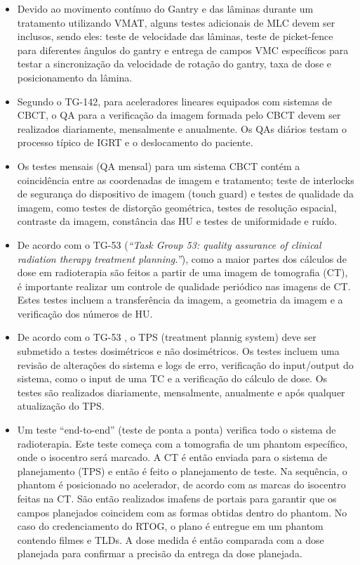 \documentclass[11pt,a4paper]{article}
\newcounter{exemplo}
\begin{document}
\begin{exemplo}[Qualidade]
\begin{itemize}
        \item Devido ao movimento contínuo do Gantry e das lâminas durante um tratamento utilizando VMAT, alguns testes adicionais de MLC devem ser inclusos, sendo eles: teste de velocidade das lâminas, teste de picket-fence para diferentes ângulos do gantry e entrega de campos VMC específicos para testar a sincronização da velocidade de rotação do gantry, taxa de dose e posicionamento da lâmina.

        \item Segundo o TG-142, para aceleradores lineares equipados com sistemas de CBCT, o QA para a verificação da imagem formada pelo CBCT devem ser realizados diariamente, mensalmente e anualmente. Os QAs diários testam o processo típico de IGRT e o deslocamento do paciente.
        
        \item Os testes mensais (QA mensal) para um sistema CBCT contém a coincidência entre as coordenadas de imagem e tratamento; teste de interlocks de segurança do dispositivo de imagem (touch guard) e testes de qualidade da imagem, como testes de distorção geométrica, testes de resolução espacial, contraste da imagem, constância das HU e testes de uniformidade e ruído.
        
        \item De acordo com o TG-53 (\textit{``Task Group 53: quality assurance of clinical radiation therapy treatment planning.''}), como a maior partes dos cálculos de dose em radioterapia são feitos a partir de uma imagem de tomografia (CT), é importante realizar um controle de qualidade periódico nas imagens de CT. Estes testes incluem a transferência da imagem, a geometria da imagem e a verificação dos números de HU.
        
        \item De acordo com o TG-53 , o TPS (treatment plannig system) deve ser submetido a testes dosimétricos e não dosimétricos. Os testes incluem uma revisão de alterações do sistema e  logs de erro, verificação do input/output do sistema, como o input de uma TC e a verificação do cálculo de dose. Os testes são realizados diariamente, mensalmente, anualmente e após qualquer atualização do TPS.  
        
        \item Um teste ``end-to-end'' (teste de ponta a ponta) verifica todo o sistema de radioterapia. Este teste começa com a tomografia de um phantom específico, onde o isocentro será marcado. A CT é então enviada para o sistema de planejamento (TPS) e então é feito o planejamento de teste. Na sequência, o phantom é posicionado no acelerador, de acordo com as marcas do isocentro feitas na CT. São então realizados imafens de portais para garantir que os campos planejados coincidem com as formas obtidas dentro do phantom. No caso do credenciamento do RTOG, o plano é entregue em um phantom contendo filmes e TLDs. A dose medida é então comparada com a dose planejada para confirmar a precisão da entrega da dose planejada.
        

\end{itemize}
\end{exemplo}
\end{document}
